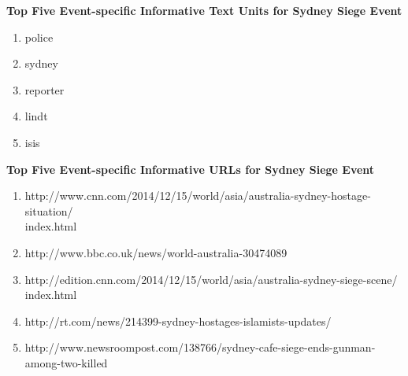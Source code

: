 \textbf{Top Five Event-specific Informative Text Units for Sydney Siege Event}
\begin{enumerate}
\item police
\item sydney
\item reporter
\item lindt
\item isis                                                                                                                                                                                                                                                                                                                                                                                                                                                                                                                
\end{enumerate}

\textbf{Top Five Event-specific Informative URLs for Sydney Siege Event}
\begin{enumerate}
\item http://www.cnn.com/2014/12/15/world/asia/australia-sydney-hostage-situation/\\index.html
\item http://www.bbc.co.uk/news/world-australia-30474089
\item http://edition.cnn.com/2014/12/15/world/asia/australia-sydney-siege-scene/\\index.html
\item http://rt.com/news/214399-sydney-hostages-islamists-updates/ 
\item http://www.newsroompost.com/138766/sydney-cafe-siege-ends-gunman-among-two-killed                                                                                                                                                                                                                                                                                                                                                                                                                                                                                                                
\end{enumerate}

